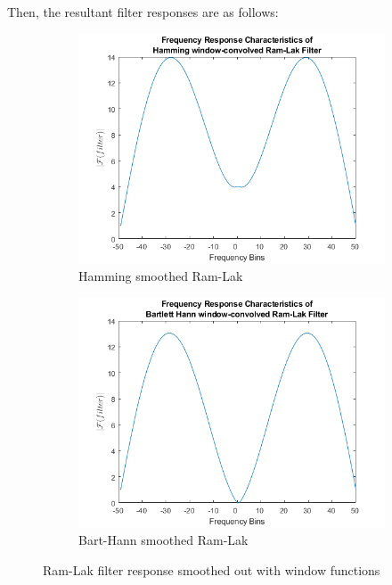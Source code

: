 \documentclass[journal]{IEEEtran}
\begin{document}
Then, the resultant filter responses are as follows:

\begin{figure}[h]
	\centering
	\begin{subfigure}[b]{0.45\columnwidth}
		\centering
	  \includegraphics[width=\linewidth]{images/smoothedhamm.png}
	  \caption{Hamming \newline smoothed Ram-Lak}
	  \label{fig:smoothhamm}
	\end{subfigure}
	\begin{subfigure}[b]{0.45\columnwidth}
		\centering
	  \includegraphics[width=\linewidth]{images/smoothedhann.png}
	  \caption{Bart-Hann \newline smoothed Ram-Lak}
	  \label{fig:smoothbarthann}
	\end{subfigure}
	\caption{Ram-Lak filter response smoothed out with window functions}
	\label{fig:smoothedfilters}
\end{figure}
\end{document}
